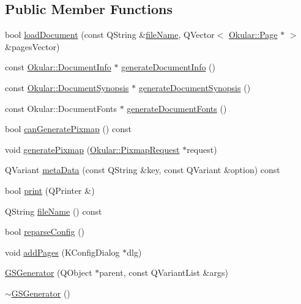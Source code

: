 \subsection*{Public Member Functions}
\begin{DoxyCompactItemize}
\item 
bool \hyperlink{classGSGenerator_ab0fb7144433d9d5bcb01fc46352ed535}{load\+Document} (const Q\+String \&\hyperlink{classGSGenerator_abe1f26c04df57978c5c34a1ef2e58622}{file\+Name}, Q\+Vector$<$ \hyperlink{classOkular_1_1Page}{Okular\+::\+Page} $\ast$ $>$ \&pages\+Vector)
\item 
const \hyperlink{classOkular_1_1DocumentInfo}{Okular\+::\+Document\+Info} $\ast$ \hyperlink{classGSGenerator_a3516212ab10dfec514985017a1f2aaf2}{generate\+Document\+Info} ()
\item 
const \hyperlink{classOkular_1_1DocumentSynopsis}{Okular\+::\+Document\+Synopsis} $\ast$ \hyperlink{classGSGenerator_a679a080deddb1d8b8d98f77645a27bad}{generate\+Document\+Synopsis} ()
\item 
const Okular\+::\+Document\+Fonts $\ast$ \hyperlink{classGSGenerator_a4d1b49a85fa61d96ba1da2268c3c189f}{generate\+Document\+Fonts} ()
\item 
bool \hyperlink{classGSGenerator_a5e33403450c32acb89ca4d7c2e86adc6}{can\+Generate\+Pixmap} () const 
\item 
void \hyperlink{classGSGenerator_a8767c6444452e2ab8e39e0df2406b6d1}{generate\+Pixmap} (\hyperlink{classOkular_1_1PixmapRequest}{Okular\+::\+Pixmap\+Request} $\ast$request)
\item 
Q\+Variant \hyperlink{classGSGenerator_af139005a25bf1231798eba23f0f4af3e}{meta\+Data} (const Q\+String \&key, const Q\+Variant \&option) const 
\item 
bool \hyperlink{classGSGenerator_a2010dbd7fb42399a0833b5658066a3cc}{print} (Q\+Printer \&)
\item 
Q\+String \hyperlink{classGSGenerator_abe1f26c04df57978c5c34a1ef2e58622}{file\+Name} () const 
\item 
bool \hyperlink{classGSGenerator_ad7f8c8c8d0a5bb85fa06a6bcbdecb56d}{reparse\+Config} ()
\item 
void \hyperlink{classGSGenerator_ae6cccf4dc11e844ec3c9d388d5582ffe}{add\+Pages} (K\+Config\+Dialog $\ast$dlg)
\item 
\hyperlink{classGSGenerator_a47d935218b452259ddfa38ff66c6b198}{G\+S\+Generator} (Q\+Object $\ast$parent, const Q\+Variant\+List \&args)
\item 
\hyperlink{classGSGenerator_abc9708c58f5f097e635fea66c8937d11}{$\sim$\+G\+S\+Generator} ()
\end{DoxyCompactItemize}
